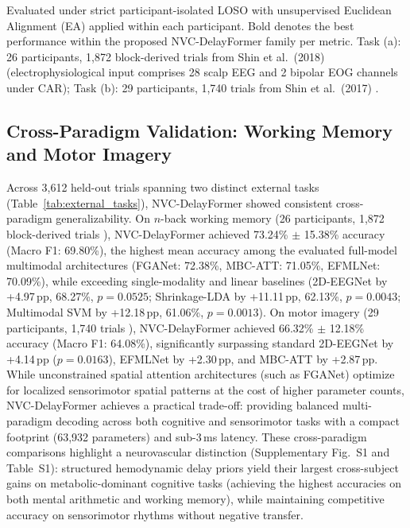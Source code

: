\documentclass[journal]{IEEEtran}
\begin{document}
\begin{table}[!t]
{\begin{tabular}{lcccc}
\bottomrule
\end{tabular}}
\par\smallskip
{\scriptsize Evaluated under strict participant-isolated LOSO with unsupervised Euclidean Alignment (EA) applied within each participant. Bold denotes the best performance within the proposed NVC-DelayFormer family per metric. Task (a): 26 participants, 1,872 block-derived trials from Shin et al.\ (2018) \cite{shin2018simultaneous} (electrophysiological input comprises 28 scalp EEG and 2 bipolar EOG channels under CAR); Task (b): 29 participants, 1,740 trials from Shin et al.\ (2017) \cite{shin2017open}.}
\end{table}


\subsection{Cross-Paradigm Validation: Working Memory and Motor Imagery}
\label{sec:external_eval}
Across 3,612 held-out trials spanning two distinct external tasks (Table~\ref{tab:external_tasks}), NVC-DelayFormer showed consistent cross-paradigm generalizability. On $n$-back working memory (26 participants, 1,872 block-derived trials \cite{shin2018simultaneous}), NVC-DelayFormer achieved 73.24\% $\pm$ 15.38\% accuracy (Macro F1: 69.80\%), the highest mean accuracy among the evaluated full-model multimodal architectures (FGANet: 72.38\%, MBC-ATT: 71.05\%, EFMLNet: 70.09\%), while exceeding single-modality and linear baselines (2D-EEGNet by +4.97\,pp, 68.27\%, $p = 0.0525$; Shrinkage-LDA by +11.11\,pp, 62.13\%, $p = 0.0043$; Multimodal SVM by +12.18\,pp, 61.06\%, $p = 0.0013$). On motor imagery (29 participants, 1,740 trials \cite{shin2017open}), NVC-DelayFormer achieved 66.32\% $\pm$ 12.18\% accuracy (Macro F1: 64.08\%), significantly surpassing standard 2D-EEGNet by +4.14\,pp ($p = 0.0163$), EFMLNet by +2.30\,pp, and MBC-ATT by +2.87\,pp. While unconstrained spatial attention architectures (such as FGANet) optimize for localized sensorimotor spatial patterns at the cost of higher parameter counts, NVC-DelayFormer achieves a practical trade-off: providing balanced multi-paradigm decoding across both cognitive and sensorimotor tasks with a compact footprint (63,932 parameters) and sub-3\,ms latency. These cross-paradigm comparisons highlight a neurovascular distinction (Supplementary Fig.~S1 and Table~S1): structured hemodynamic delay priors yield their largest cross-subject gains on metabolic-dominant cognitive tasks (achieving the highest accuracies on both mental arithmetic and working memory), while maintaining competitive accuracy on sensorimotor rhythms without negative transfer.
\end{document}

